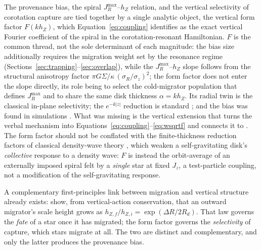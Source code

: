 \documentclass[twocolumn]{aastex701}
\newcommand{\Jz}{J_z}
\newcommand{\JR}{J_R}
\newcommand{\hZ}{h_Z}
\newcommand{\sigz}{\sigma_z}
\newcommand{\sigR}{\sigma_R}
\begin{document}
The provenance bias, the spiral $\JR^{\max}$--$\hZ$ relation, and the vertical
selectivity of corotation capture are tied together by a single analytic object, the
vertical form factor $F(k\hZ)$, which Equation~\eqref{eq:coupling} identifies as the
exact vertical Fourier coefficient of the spiral in the corotation-resonant
Hamiltonian. $F$ is the common thread, not the sole determinant of each magnitude:
the bias size additionally requires the migration weight set by the resonance regime
(Sections~\ref{sec:trapping}--\ref{sec:overlap}), while the
$\JR^{\max}$--$\hZ$ slope follows from the structural anisotropy factor
$\pi G\Sigma/\kappa\,(\sigR/\sigz)^2$; the form factor does not enter the slope
directly, its role being to select the cold-migrator population that defines
$\JR^{\max}$ and to share the same disk thickness $\alpha=k\hZ$.
Its radial twin is the classical \citet{DanielWyse2015} in-plane
selectivity; the $e^{-k|z|}$ reduction is standard \citep{BinneyTremaine2008}; and
the bias was found in simulations \citep{VeraCiro2016imprint,Mikkola2020}. What was
missing is the vertical extension that turns the verbal mechanism into
Equations~\eqref{eq:coupling}--\eqref{eq:wsqrtf} and connects it to
\citet{Palicio2024}. The form factor should not be conflated with the
finite-thickness reduction factors of classical density-wave theory
\citep{Toomre1964}, which weaken a self-gravitating disk's \emph{collective}
response to a density wave: $F$ is instead the orbit-average of an externally
imposed spiral felt by a \emph{single} star at fixed $\Jz$, a test-particle
coupling, not a modification of the self-gravitating response.

A complementary first-principles link between migration and vertical structure
already exists: \citet{Roskar2013} show, from vertical-action conservation, that an
outward migrator's scale height grows as $h_{Z,f}/h_{Z,i}=\exp(\Delta R/2R_d)$.
That law governs the \emph{fate} of a star once it has migrated; the form factor
governs the \emph{selectivity} of capture, which stars migrate at all. The two are
distinct and complementary, and only the latter produces the provenance bias.
\end{document}
